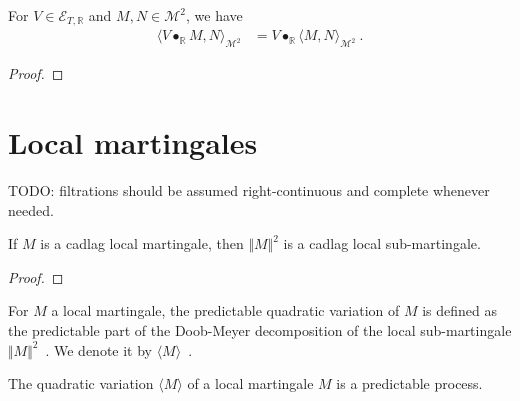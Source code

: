 \begin{lemma}\label{lem:inner_elemStochIntegral}
For $V \in \mathcal{E}_{T, \mathbb{R}}$ and $M, N \in \mathcal{M}^2$, we have
\begin{align*}
  \langle V \bullet_{\mathbb{R}} M, N \rangle_{\mathcal{M}^2}
  &= V \bullet_{\mathbb{R}} \langle M, N \rangle_{\mathcal{M}^2}
  \: .
\end{align*}
\end{lemma}

\begin{proof}

\end{proof}





\section{Local martingales}

TODO: filtrations should be assumed right-continuous and complete whenever needed.


\begin{lemma}\label{lem:IsLocalMartingale.isLocalSubmartingale_sq_norm}
  \leanok
If $M$ is a cadlag local martingale, then $\Vert M \Vert^2$ is a cadlag local sub-martingale.
\end{lemma}

\begin{proof}

\end{proof}


\begin{definition}\label{def:quadraticVariation}
  \leanok
For $M$ a local martingale, the predictable quadratic variation of $M$ is defined as the predictable part of the Doob-Meyer decomposition of the local sub-martingale $\Vert M \Vert^2$~.
We denote it by $\langle M \rangle$~.
\end{definition}


\begin{lemma}\label{lem:predictable_quadraticVariation}
The quadratic variation $\langle M \rangle$ of a local martingale $M$ is a predictable process.
\end{lemma}

